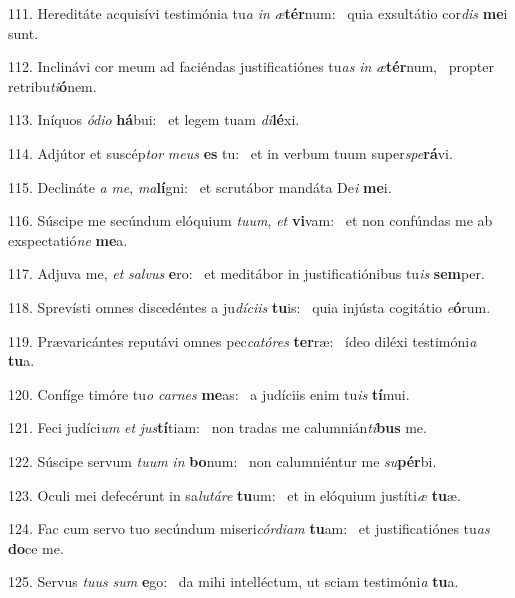 111. Hereditáte acquisívi testimónia tu\textit{a} \textit{in} \textit{æ}\textbf{tér}num: \ast\  quia exsultátio cor\textit{dis} \textbf{me}i sunt.\

112. Inclinávi cor meum ad faciéndas justificatiónes tu\textit{as} \textit{in} \textit{æ}\textbf{tér}num, \ast\  propter retribu\textit{ti}\textbf{ó}nem.\

113. Iníquos \textit{ó}\textit{di}\textit{o} \textbf{há}bui: \ast\  et legem tuam \textit{di}\textbf{lé}xi.\

114. Adjútor et suscép\textit{tor} \textit{me}\textit{us} \textbf{es} tu: \ast\  et in verbum tuum super\textit{spe}\textbf{rá}vi.\

115. Declináte \textit{a} \textit{me}, \textit{ma}\textbf{lí}gni: \ast\  et scrutábor mandáta De\textit{i} \textbf{me}i.\

116. Súscipe me secúndum elóquium \textit{tu}\textit{um}, \textit{et} \textbf{vi}vam: \ast\  et non confúndas me ab exspectatió\textit{ne} \textbf{me}a.\

117. Adjuva me, \textit{et} \textit{sal}\textit{vus} \textbf{e}ro: \ast\  et meditábor in justificatiónibus tu\textit{is} \textbf{sem}per.\

118. Sprevísti omnes discedéntes a ju\textit{dí}\textit{ci}\textit{is} \textbf{tu}is: \ast\  quia injústa cogitátio \textit{e}\textbf{ó}rum.\

119. Prævaricántes reputávi omnes pec\textit{ca}\textit{tó}\textit{res} \textbf{ter}ræ: \ast\  ídeo diléxi testimóni\textit{a} \textbf{tu}a.\

120. Confíge timóre tu\textit{o} \textit{car}\textit{nes} \textbf{me}as: \ast\  a judíciis enim tu\textit{is} \textbf{tí}mui.\

121. Feci judíci\textit{um} \textit{et} \textit{jus}\textbf{tí}tiam: \ast\  non tradas me calumnián\textit{ti}\textbf{bus} me.\

122. Súscipe servum \textit{tu}\textit{um} \textit{in} \textbf{bo}num: \ast\  non calumniéntur me \textit{su}\textbf{pér}bi.\

123. Oculi mei defecérunt in sa\textit{lu}\textit{tá}\textit{re} \textbf{tu}um: \ast\  et in elóquium justíti\textit{æ} \textbf{tu}æ.\

124. Fac cum servo tuo secúndum miseri\textit{cór}\textit{di}\textit{am} \textbf{tu}am: \ast\  et justificatiónes tu\textit{as} \textbf{do}ce me.\

125. Servus \textit{tu}\textit{us} \textit{sum} \textbf{e}go: \ast\  da mihi intelléctum, ut sciam testimóni\textit{a} \textbf{tu}a.\

